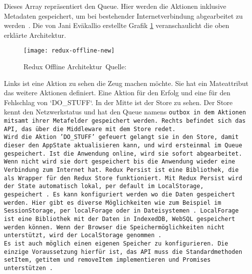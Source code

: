 Dieses Array repräsentiert den \gls{Queue}. Hier werden die Aktionen inklusive Metadaten gespeichert, um bei bestehender Internetverbindung abgearbeitet zu werden~\cite{redux-offline-docs}.
Die von Jani Eväkallio erstellte Grafik \ref{fig:redux-offline} veranschaulicht die oben erklärte Architektur.
%
\begin{figure}[h]
  \centering
  \texttt{[image: redux-offline-new]}
  \grayRule
  \caption[Redux Offline]{Redux Offline Architektur~Quelle:~\cite{redux-offline}}
  \label{fig:redux-offline}
\end{figure}
%
Links ist eine Aktion zu sehen die Zeug machen möchte. Sie hat ein Mateattribut das weitere Aktionen definiert. Eine Aktion für den Erfolg und eine für den Fehlschlag von `DO\_STUFF`.
In der Mitte ist der Store zu sehen.
Der Store kennt den Netzwerkstatus und hat den \gls{Queue} namens \tt{outbox} in dem Aktionen mitsamt ihrer Metafelder gespeichert werden. Rechts befindet sich das \gls{API}, das über die \gls{Middleware} mit dem Store redet.\\
Wird die Aktion 'DO\_STUFF' gefeuert gelangt sie in den Store, damit dieser den \gls{App}State aktualisieren kann, und wird ersteinmal im \gls{Queue} gespeichert.
Ist die Anwendung online, wird sie sofort abgearbeitet. Wenn nicht wird sie dort gespeichert bis die Anwendung wieder eine Verbindung zum Internet hat.   
%
%
Redux Persist ist eine Bibliothek, die als Wrapper für den Redux Store funktioniert. Mit Redux Persist wird der State automatisch lokal, per default im LocalStorage, gespeichert~\cite{redux-persist}.
Es kann konfiguriert werden wo die Daten gespeichert werden. Hier gibt es diverse Möglichkeiten wie zum Beispiel im SessionStorage, per localForage oder in Dateisystemen~\cite{redux-persist-gh}. LocalForage ist eine Bibliothek mit der Daten in IndexedDB, WebSQL gespeichert werden können. Wenn der Browser die Speichermöglichkeiten nicht unterstützt, wird der LocalStorage genommen~\cite{localforage}.\\
Es ist auch möglich einen eigenen Speicher zu konfigurieren. Die einzige Voraussetzung hierfür ist, das \gls{API} muss die Standardmethoden \tt{setItem}, \tt{getitem} und \tt{removeItem} implementieren und Promises unterstützen~\cite{redux-persist-gh}.
%
%
